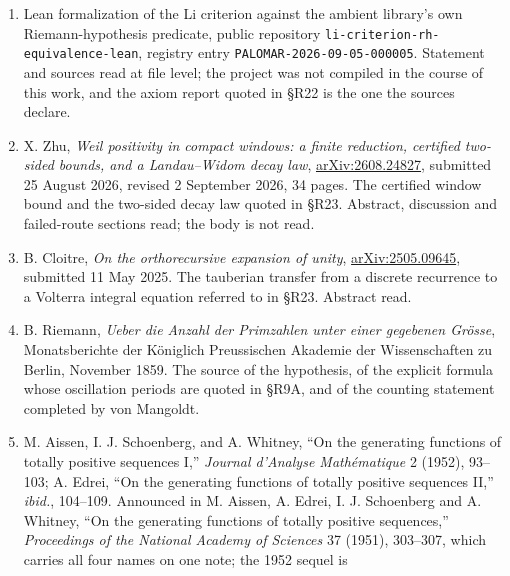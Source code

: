 \documentclass[
  11pt,
]{book}
\providecommand{\tightlist}{%
  \setlength{\itemsep}{0pt}\setlength{\parskip}{0pt}}
\begin{document}
\begin{enumerate}
  \begin{enumerate}
  \def\labelenumii{\arabic{enumii}.}
  \setcounter{enumii}{2025}
  \tightlist
  \item
    Positivity in every degree from strict negativity of all Verblunsky
    coefficients of an associated circle measure. Cited in §R12A as the
    transporting case. Abstract read.
  \end{enumerate}
\item
  Lean formalization of the Li criterion against the ambient library's
  own Riemann-hypothesis predicate, public repository
  \texttt{li-criterion-rh-equivalence-lean}, registry entry
  \texttt{PALOMAR-2026-09-05-000005}. Statement and sources read at file
  level; the project was not compiled in the course of this work, and
  the axiom report quoted in §R22 is the one the sources declare.
\item
  X. Zhu, \emph{Weil positivity in compact windows: a finite reduction,
  certified two-sided bounds, and a Landau--Widom decay law},
  \href{https://arxiv.org/abs/2608.24827}{arXiv:2608.24827}, submitted
  25 August 2026, revised 2 September 2026, 34 pages. The certified
  window bound and the two-sided decay law quoted in §R23. Abstract,
  discussion and failed-route sections read; the body is not read.
\item
  B. Cloitre, \emph{On the orthorecursive expansion of unity},
  \href{https://arxiv.org/abs/2505.09645}{arXiv:2505.09645}, submitted
  11 May 2025. The tauberian transfer from a discrete recurrence to a
  Volterra integral equation referred to in §R23. Abstract read.
\item
  B. Riemann, \emph{Ueber die Anzahl der Primzahlen unter einer
  gegebenen Grösse}, Monatsberichte der Königlich Preussischen Akademie
  der Wissenschaften zu Berlin, November 1859. The source of the
  hypothesis, of the explicit formula whose oscillation periods are
  quoted in §R9A, and of the counting statement completed by von
  Mangoldt.
\item
  M. Aissen, I. J. Schoenberg, and A. Whitney, ``On the generating
  functions of totally positive sequences I,'' \emph{Journal d'Analyse
  Mathématique} 2 (1952), 93--103; A. Edrei, ``On the generating
  functions of totally positive sequences II,'' \emph{ibid.}, 104--109.
  Announced in M. Aissen, A. Edrei, I. J. Schoenberg and A. Whitney,
  ``On the generating functions of totally positive sequences,''
  \emph{Proceedings of the National Academy of Sciences} 37 (1951),
  303--307, which carries all four names on one note; the 1952 sequel is

\end{enumerate}
\end{document}
